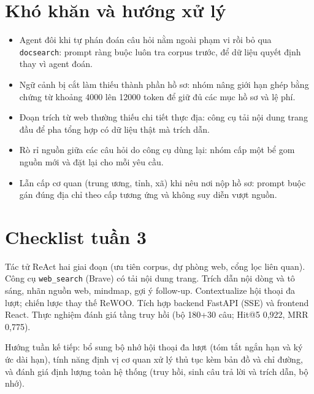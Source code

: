 \documentclass[11pt]{article}
\begin{document}
\section{Khó khăn và hướng xử lý}
\begin{itemize}
  \item Agent đôi khi tự phán đoán câu hỏi nằm ngoài phạm vi rồi bỏ qua \texttt{docsearch}:
        prompt ràng buộc luôn tra corpus trước, để dữ liệu quyết định thay vì agent đoán.
  \item Ngữ cảnh bị cắt làm thiếu thành phần hồ sơ: nhóm nâng giới hạn ghép bằng chứng từ
        khoảng 4000 lên 12000 token để giữ đủ các mục hồ sơ và lệ phí.
  \item Đoạn trích từ web thường thiếu chi tiết thực địa: công cụ tải nội dung trang đầu để
        pha tổng hợp có dữ liệu thật mà trích dẫn.
  \item Rò rỉ nguồn giữa các câu hỏi do công cụ dùng lại: nhóm cấp một bể gom nguồn mới và đặt
        lại cho mỗi yêu cầu.
  \item Lẫn cấp cơ quan (trung ương, tỉnh, xã) khi nêu nơi nộp hồ sơ: prompt buộc gán đúng địa
        chỉ theo cấp tương ứng và không suy diễn vượt nguồn.
\end{itemize}

\section{Checklist tuần 3}
\begin{itemize}[label={}]
  \cbDone Tác tử ReAct hai giai đoạn (ưu tiên corpus, dự phòng web, cổng lọc liên quan).
  \cbDone Công cụ \texttt{web\_search} (Brave) có tải nội dung trang.
  \cbDone Trích dẫn nội dòng và tô sáng, nhãn nguồn web, mindmap, gợi ý follow-up.
  \cbDone Contextualize hội thoại đa lượt; chiến lược thay thế ReWOO.
  \cbDone Tích hợp backend FastAPI (SSE) và frontend React.
  \cbDone Thực nghiệm đánh giá tầng truy hồi (bộ 180+30 câu; Hit@5 0,922, MRR 0,775).
\end{itemize}

\noindent Hướng tuần kế tiếp: bổ sung bộ nhớ hội thoại đa lượt (tóm tắt ngắn hạn và ký ức dài
hạn), tính năng định vị cơ quan xử lý thủ tục kèm bản đồ và chỉ đường, và đánh giá định lượng
toàn hệ thống (truy hồi, sinh câu trả lời và trích dẫn, bộ nhớ).
\end{document}
